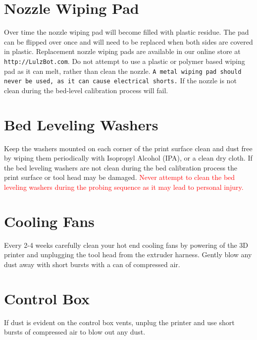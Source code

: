 \section{Nozzle Wiping Pad}
Over time the nozzle wiping pad will become filled with plastic residue. The pad can be flipped over once and will need to be replaced when both sides are covered in plastic. Replacement nozzle wiping pads are available in our online store at \texttt{http://LulzBot.com}. Do not attempt to use a plastic or polymer based wiping pad as it can melt, rather than clean the nozzle. \texttt{A metal wiping pad should never be used, as it can cause electrical shorts.} If the nozzle is not clean during the bed-level calibration process will fail.

\section{Bed Leveling Washers}
Keep the washers mounted on each corner of the print surface clean and dust free by wiping them periodically with Isopropyl Alcohol (IPA), or a clean dry cloth. If the bed leveling washers are not clean during the bed calibration process the print surface or tool head may be damaged. \textcolor{red}{Never attempt to clean the bed leveling washers during the probing sequence as it may lead to personal injury.}

\section{Cooling Fans}
Every 2-4 weeks carefully clean your hot end cooling fans by powering of the 3D printer and unplugging the tool head from the extruder harness. Gently blow any dust away with short bursts with a can of compressed air. 


\section{Control Box}
If dust is evident on the control box vents, unplug the printer and use short bursts of compressed air to blow out any dust.
